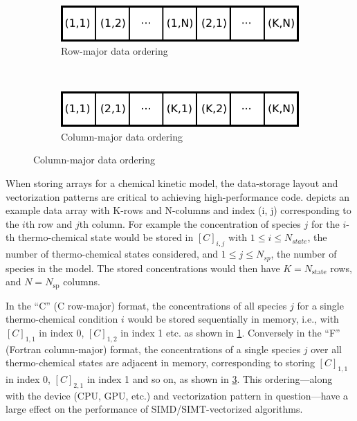 \documentclass[12pt,number,sort&compress]{elsarticle}
\newcommand{\ns}{N_{sp}}
\begin{document}
\begin{figure}[htb]
\begin{minipage}{0.45\linewidth}
    \begin{subfigure}[t]{\textwidth}
	\includegraphics[width=\textwidth]{row_major.pdf}
	\caption{Row-major data ordering}
	\label{F:row_major}
    \end{subfigure}
    \\
    \begin{subfigure}[t]{\textwidth}
	\includegraphics[width=\textwidth]{column_major.pdf}
	\caption{Column-major data ordering}
	\label{F:column_major}
    \end{subfigure}
  \end{minipage}
\end{figure}

When storing arrays for a chemical kinetic model, the data-storage layout and vectorization patterns are critical to achieving high-performance code.
 depicts an example data array with K-rows and N-columns and index (i, j) corresponding to the $i$th row and $j$th column.
For example the concentration of species $j$ for the $i$-th thermo-chemical state would be stored in $[C]_{i, j}$ with $1 \le i \le N_{state}$, the number of thermo-chemical states considered, and $1 \le j \le \ns$, the number of species in the model.
The stored concentrations would then have $K = N_{\text{state}}$ rows, and $N = N_{\text{sp}}$ columns.

In the ``C'' (C row-major) format, the concentrations of all species $j$ for a single thermo-chemical condition $i$ would be stored sequentially in memory, i.e., with  $[C]_{1, 1}$ in index \num{0}, $[C]_{1, 2}$ in index \num{1} etc. as shown in \cref{F:row_major}.
Conversely in the ``F'' (Fortran column-major) format, the concentrations of a single species $j$ over all thermo-chemical states are adjacent in memory, corresponding to storing $[C]_{1, 1}$ in index \num{0}, $[C]_{2, 1}$ in index \num{1} and so on, as shown in \cref{F:column_major}.
This ordering---along with the device (CPU, GPU, etc.) and vectorization pattern in question---have a large effect on the performance of SIMD\slash SIMT-vectorized algorithms.
\end{document}
